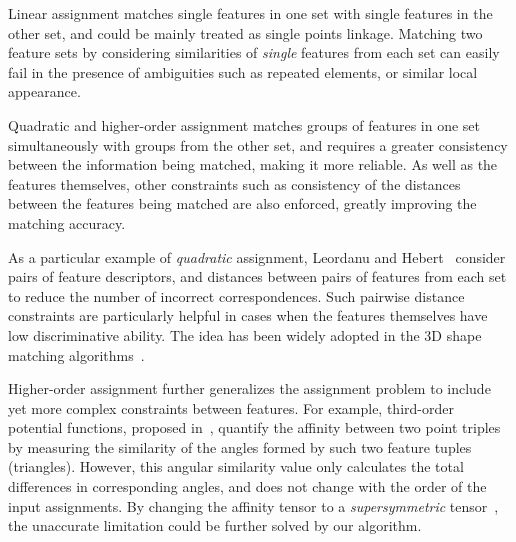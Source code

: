 Linear assignment matches single features in one set with single features in the other set, and could be mainly treated as single points linkage.
Matching two feature sets by considering similarities of \emph{single} features from each set can easily fail in the presence of ambiguities such as repeated elements,
or similar local appearance.

Quadratic and higher-order assignment matches groups of features in one set simultaneously with groups from the other set,
and requires a greater consistency between the information being matched, making it more reliable.
As well as the features themselves, other constraints such as consistency of the distances between the features being matched are also enforced,
greatly improving the matching accuracy.

As a particular example of \emph{quadratic} assignment, Leordanu and Hebert~\cite{Leordeanu05} consider pairs of feature descriptors,
and distances between pairs of features from each set to reduce the number of incorrect correspondences.
Such pairwise distance constraints are particularly helpful in cases when the features themselves have low discriminative ability.
The idea has been widely adopted in the 3D shape matching algorithms~\cite{Tevs09,Ovsjanikov10,Tevs11,Kim11,SahilliogluY11,Windheuser11}.

Higher-order assignment further generalizes the assignment problem to include yet more complex constraints between features.
For example, third-order potential functions, proposed in~\cite{Duchenne_etal09,Zeng10,Chertok10},
quantify the affinity between two point triples by measuring the similarity of the angles formed by such two feature tuples (triangles).
However, this angular similarity value only calculates the total differences in corresponding angles,
and does not change with the order of the input assignments.
By changing the affinity tensor to a \emph{supersymmetric} tensor~\cite{Kofidis02}, the unaccurate limitation could be further solved by our algorithm.

